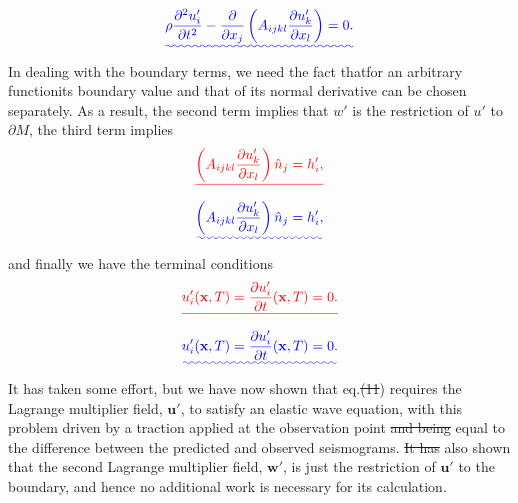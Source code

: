 \documentclass[a4paper,12pt]{paper}
\providecommand{\DIFadd}[1]{{\protect\color{blue}\uwave{#1}}} %
\providecommand{\DIFdel}[1]{{\protect\color{red}\sout{#1}}}                      %
\providecommand{\DIFaddbegin}{} %
\providecommand{\DIFaddend}{} %
\providecommand{\DIFdelbegin}{} %
\providecommand{\DIFdelend}{} %
\begin{document}
\DIFdelend \DIFaddbegin \begin{equation}
\DIFadd{\rho\frac{\partial^{2}u_{i}'}{\partial t^{2}}-\frac{\partial}{\partial x_{j}}\left(A_{ijkl}\frac{\partial u_{k}'}{\partial x_{l}}\right)=0.
\label{eq:26}
}\end{equation}\DIFaddend 
In dealing with the boundary terms, we need the fact that\DIFaddbegin \DIFadd{, }\DIFaddend for an arbitrary function\DIFaddbegin \DIFadd{, }\DIFaddend its boundary value and that of 
its normal derivative can be chosen separately. As a result, the second term implies that \DIFdelbegin \DIFdel{$w'$ }\DIFdelend \DIFaddbegin \DIFadd{$\mathbf{w}'$ }\DIFaddend is the restriction 
of \DIFdelbegin \DIFdel{$u'$ }\DIFdelend \DIFaddbegin \DIFadd{$\mathbf{u}'$ }\DIFaddend to $\partial M$, the third term implies
\DIFdelbegin \begin{displaymath}
\DIFdel{\left(A_{ijkl}\frac{\partial u_{k}'}{\partial x_{l}}\right)\hat{n}_{j}=h_{i}',
}\end{displaymath}%
\DIFdelend \DIFaddbegin \begin{equation}
\DIFadd{\left(A_{ijkl}\frac{\partial u_{k}'}{\partial x_{l}}\right)\hat{n}_{j}=h_{i}',
\label{eq:27}
}\end{equation}\DIFaddend 
and finally we have the terminal conditions
\DIFdelbegin \begin{displaymath}
\DIFdel{u_{i}'(\mathbf{x},T)=\frac{\partial u_{i}'}{\partial t}(\mathbf{x},T)=0.
}\end{displaymath}%
\DIFdelend \DIFaddbegin \begin{equation}
\DIFadd{u_{i}'(\mathbf{x},T)=\frac{\partial u_{i}'}{\partial t}(\mathbf{x},T)=0.
\label{eq:28}
}\end{equation}\DIFaddend 
It has taken some effort, but we have now shown that eq.\DIFdelbegin \DIFdel{(11}\DIFdelend \DIFaddbegin \DIFadd{~(\ref{eq:11}}\DIFaddend ) requires the Lagrange multiplier field, $\mathbf{u}'$, 
to satisfy an elastic wave equation, with this problem driven by a traction applied at the observation point \DIFdelbegin \DIFdel{and 
being }\DIFdelend \DIFaddbegin \DIFadd{that is 
}\DIFaddend equal to the difference between the predicted and observed seismograms. \DIFdelbegin \DIFdel{It has }\DIFdelend \DIFaddbegin \DIFadd{We have }\DIFaddend also shown that the second 
Lagrange multiplier field, $\mathbf{w}'$, is just the restriction of $\mathbf{u}'$ to the boundary, and 
hence no additional work is necessary for its calculation.
\end{document}
